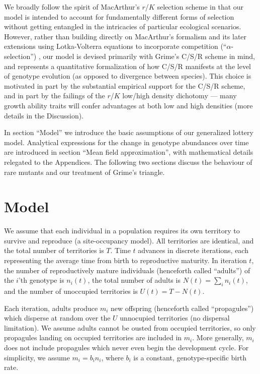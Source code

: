 \documentclass[11pt]{article}
\begin{document}
We broadly follow the spirit of MacArthur's $r$/$K$ selection scheme in that our model is intended to account for fundamentally different forms of selection without getting  entangled in the intricacies of particular ecological scenarios. However, rather than building directly on MacArthur's formalism and its later extensions using Lotka-Volterra equations to incorporate competition (``$\alpha$-selection'') \citep{gill_1974,case_1974,joshi_2001}, our model is devised primarily with Grime's C/S/R scheme in mind, and represents a quantitative formalization of how C/S/R manifests at the level of genotype evolution (as opposed to divergence between species). This choice is motivated in part by the substantial empirical support for the C/S/R scheme, and in part by the failings of the $r$/$K$ low/high density dichotomy --- many growth ability traits will confer advantages at both low and high densities (more details in the Discussion). 

In section ``Model'' we introduce the basic assumptions of our generalized lottery model. Analytical expressions for the change in genotype abundances over time are introduced in section ``Mean field approximation'', with mathematical details relegated to the Appendices. The following two sections discuss the behaviour of rare mutants and our treatment of Grime's triangle. 
 

\section*{Model}\label{sec:model}

We assume that each individual in a population requires its own territory to survive and reproduce (a site-occupancy model). All territories are identical, and the total number of territories is $T$. Time $t$ advances in discrete iterations, each representing the average time from birth to reproductive maturity. In iteration $t$, the number of reproductively mature individuals (henceforth called ``adults'') of the $i$'th genotype is $n_i(t)$, the total number of adults is $N(t)=\sum_i n_i(t)$, and the number of unoccupied territories is $U(t)=T-N(t)$. 

Each iteration, adults produce $m_i$ new offspring (henceforth called ``propagules'') which disperse at random over the $U$ unnocupied territories (no dispersal limitation). We assume adults cannot be ousted from occupied territories, so only propagules landing on occupied territories are included in $m_i$. More generally, $m_i$ does not include propagules which never even begin the development cycle. For simplicity, we assume $m_i=b_i n_i$, where $b_i$ is a constant, genotype-specific birth rate. 
\end{document}
